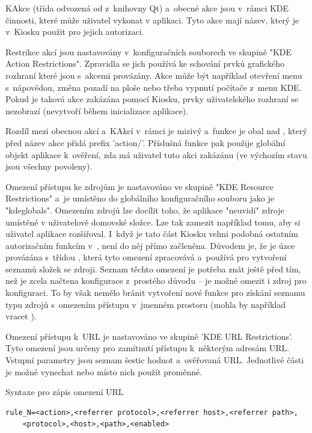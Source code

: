 KAkce (třída  odvozená od  z~knihovny Qt) a~obecné akce jsou v~rámci KDE činnosti, které může uživatel vykonat v aplikaci. Tyto akce mají název, který je v~Kiosku použit pro jejich autorizaci.

Restrikce akcí jsou nastavovány v~konfiguračních souborech ve skupině "KDE Action Restrictions". Zpravidla se jich používá ke schování prvků grafického rozhraní které jsou s~akcemi provázány. Akce může být například otevření menu s~nápovědou, změna pozadí na ploše nebo třeba vypnutí počítače z~menu KDE. Pokud je taková akce zakázána pomocí Kiosku, prvky uživatelského rozhraní se nezobrazí (nevytvoří během inicializace aplikace).

Rozdíl mezi obecnou akcí a~KAkcí v~rámci  je mizivý a~funkce  je obal nad , který před název akce přidá prefix 'action/'. Příslušná funkce pak použije globální  objekt aplikace k~ověření, zda má uživatel tuto akci zakázánu (ve výchozím stavu jsou všechny povoleny).

Omezení přístupu ke zdrojům je nastavováno ve skupině "KDE Resource Restrictions" a~je umístěno do globálního konfiguračního souboru jako je "kdeglobals". Omezením zdrojů lze docílit toho, že aplikace "neuvidí" zdroje umístěné v uživatelově domovské složce. Lze tak zamezit například tomu, aby si uživatel aplikace rozšiřoval. I~když je tato část Kiosku velmi podobná ostatním autorizačním funkcím v~, není do něj přímo začleněna. Důvodem je, že je úzce provázána s~třídou , která tyto omezení zpracovává a~používá pro vytvoření seznamů složek se zdroji. Seznam těchto omezení je potřeba znát ještě před tím, než je zcela načtena konfigurace z~prostého důvodu -- je možné omezit i zdroj pro konfiguraci. To by však nemělo bránit vytvoření nové funkce pro získání seznamu typu zdrojů s~omezením přístupu v~jmenném prostoru  (mohla by například vracet ).

Omezení přístupu k~URL je nastavováno ve skupině 'KDE URL Restrictions'. Tyto omezení jsou určeny pro zamítnutí přístupu k~některým adresám URL. Vstupní parametry jsou seznam šestic hodnot a~ověřovaná URL. Jednotlivé části je možné vynechat nebo místo nich použít proměnné.
\begin{mylisting}
\caption{Syntaxe pro zápis omezení URL}
\label{url_syntax}
\begin{lstlisting}
rule_N=<action>,<referrer protocol>,<referrer host>,<referrer path>,
    <protocol>,<host>,<path>,<enabled>
\end{lstlisting}
\end{mylisting}

